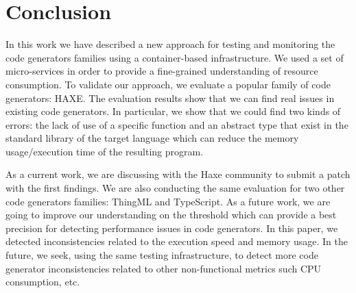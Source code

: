 




\section{Conclusion}
\label{sec:cg-conclusion}
In this work we have described a new approach for testing and monitoring the code generators families using a container-based infrastructure. 
We used a set of micro-services in order to provide a fine-grained understanding of resource consumption. 
To validate our approach, we evaluate a popular family of code generators: HAXE. 
The evaluation results show that we can find real issues in existing code generators. 
In particular, we show that we could find two kinds of errors: the lack of use of a specific function and an abstract type that exist in the standard library of the target language which can reduce the memory usage/execution time of the resulting program.

As a current work, we are discussing with the Haxe community to submit a patch with the first findings. 
We are also conducting the same evaluation for two other code generators families: ThingML and TypeScript. 
As a future work, we are going to improve our understanding on the threshold which can provide a best precision for detecting performance issues in code generators. 
In this paper, we detected inconsistencies related to the execution speed and memory usage. In the future, we seek, using the same testing infrastructure, to detect more code generator inconsistencies related to other non-functional metrics such CPU consumption, etc. 






















